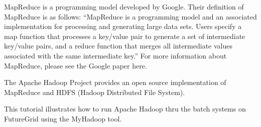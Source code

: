 MapReduce is a programming model developed by Google. Their definition of MapReduce is as follows: “MapReduce is a programming model and an associated implementation for processing and generating large data sets. Users specify a map function that processes a key/value pair to generate a set of intermediate key/value pairs, and a reduce function that merges all intermediate values associated with the same intermediate key.” For more information about MapReduce, please see the Google paper here.

The Apache Hadoop Project provides an open source implementation of MapReduce and HDFS (Hadoop Distributed File System).

This tutorial illustrates how to run Apache Hadoop thru the batch systems on FutureGrid using the MyHadoop tool.


